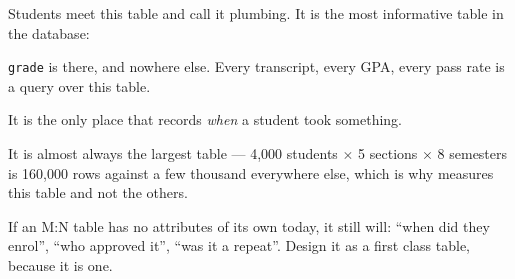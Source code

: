 \begin{alertbox}
Students meet this table and call it plumbing. It is the most informative
table in the database:

\begin{tight}
  \item \texttt{grade} is there, and nowhere else. Every transcript, every GPA,
        every pass rate is a query over this table.
  \item It is the only place that records \emph{when} a student took something.
  \item It is almost always the largest table --- 4{,}000 students $\times$ 5
        sections $\times$ 8 semesters is 160{,}000 rows against a few thousand
        everywhere else, which is why  measures this table and
        not the others.
\end{tight}

\smallskip
If an M:N table has no attributes of its own today, it still will: ``when did
they enrol'', ``who approved it'', ``was it a repeat''. Design it as a first
class table, because it is one.
\end{alertbox}

